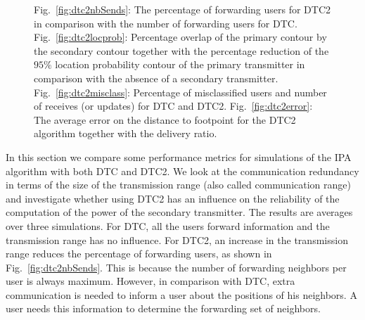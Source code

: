 \begin{figure}[!b]
\caption{Fig.~\ref{fig:dtc2nbSends}: The percentage of forwarding users for DTC2 in comparison with the number of forwarding users for DTC. Fig.~\ref{fig:dtc2locprob}: Percentage overlap of the primary contour by the secondary contour together with the percentage reduction of the $95\%$ location probability contour of the primary transmitter in comparison with the absence of a secondary transmitter. Fig.~\ref{fig:dtc2misclass}: Percentage of misclassified users and number of receives (or updates) for DTC and DTC2. Fig.~\ref{fig:dtc2error}: The average error on the distance to footpoint for the DTC2 algorithm together with the delivery ratio.}
\end{figure}

In this section we compare some performance metrics for simulations of the IPA algorithm with both DTC and DTC2. We look at the communication redundancy in terms of the size of the transmission range (also called communication range) and investigate whether using DTC2 has an influence on the reliability of the computation of the power of the secondary transmitter. The results are averages over three simulations. For DTC, all the users forward information and the transmission range has no influence. For DTC2, an increase in the transmission range reduces the percentage of forwarding users, as shown in Fig.~\ref{fig:dtc2nbSends}. This is because the number of forwarding neighbors per user is always maximum. However, in comparison with DTC, extra communication is needed to inform a user about the positions of his neighbors. A user needs this information to determine the forwarding set of neighbors. 


